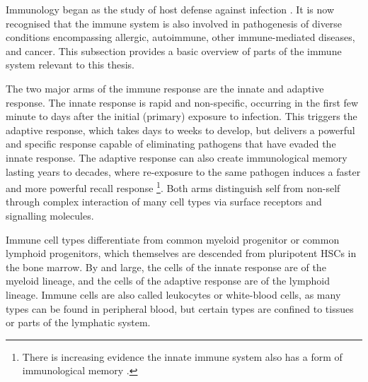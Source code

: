 \begin{outline}
Immunology began as the study of host defense against infection \autocite{murphy2016JanewayImmunobiology}.
It is now recognised that the immune system is also involved in pathogenesis of diverse conditions encompassing allergic, autoimmune, other immune-mediated diseases, and cancer.
This subsection provides a basic overview of parts of the immune system relevant to this thesis.

The two major arms of the immune response are the innate and adaptive response.
The innate response is rapid and non-specific, 
occurring in the first few minute to days after the initial (primary) exposure to infection.
This triggers the adaptive response, which takes days to weeks to develop, 
but delivers a powerful and specific response capable of eliminating pathogens that have evaded the innate response.
The adaptive response can also create immunological memory lasting years to decades,
where re-exposure to the same pathogen induces a faster and more powerful recall response%
\footnote{
    There is increasing evidence the innate immune system also has a form of immunological memory \autocite{dominguez-andres2020SpecificsInnateImmune}.
}.
Both arms distinguish self from non-self through complex interaction of many cell types via surface receptors and signalling molecules.

Immune cell types differentiate from common myeloid progenitor or common lymphoid progenitors,
which themselves are descended from pluripotent \glspl{HSC} in the bone marrow.
By and large, the cells of the innate response are of the myeloid lineage, 
and the cells of the adaptive response are of the lymphoid lineage.
Immune cells are also called leukocytes or white-blood cells, 
as many types can be found in peripheral blood, 
but certain types are confined to tissues or parts of the lymphatic system.


\end{outline}
